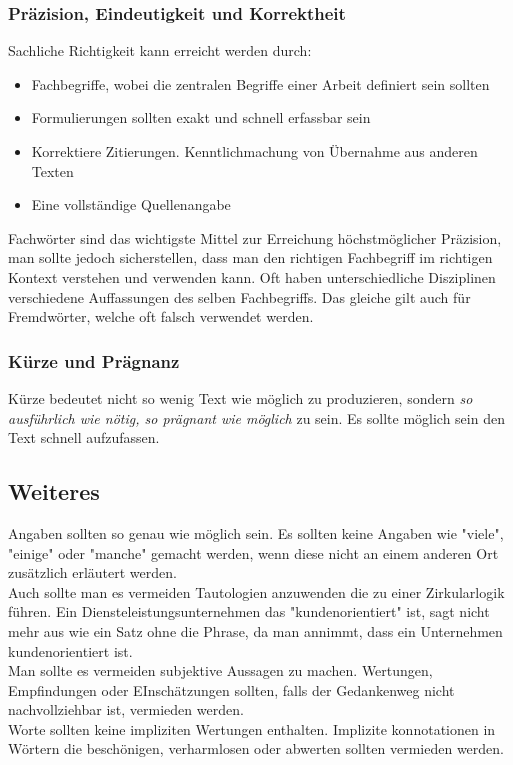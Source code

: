 \documentclass{article}
\begin{document}
	\subsubsection{Präzision, Eindeutigkeit und Korrektheit}
	Sachliche Richtigkeit kann erreicht werden durch:
	\begin{itemize}
		\item{Fachbegriffe, wobei die zentralen Begriffe einer Arbeit definiert sein sollten}
		\item{Formulierungen sollten exakt und schnell erfassbar sein}
		\item{Korrektiere Zitierungen. Kenntlichmachung von Übernahme aus anderen Texten}
		\item{Eine vollständige Quellenangabe}
	\end{itemize}
	Fachwörter sind das wichtigste Mittel zur Erreichung höchstmöglicher Präzision, man sollte jedoch sicherstellen, dass man den richtigen Fachbegriff im richtigen Kontext verstehen und verwenden kann. Oft haben unterschiedliche Disziplinen verschiedene Auffassungen des selben Fachbegriffs. Das gleiche gilt auch für Fremdwörter, welche oft falsch verwendet werden. \\
	\subsubsection{Kürze und Prägnanz}
	Kürze bedeutet nicht so wenig Text wie möglich zu produzieren, sondern \textit{so ausführlich wie nötig, so prägnant wie möglich} zu sein. Es sollte möglich sein den Text schnell aufzufassen.\\
	\subsection{Weiteres}
	Angaben sollten so genau wie möglich sein. Es sollten keine Angaben wie "viele", "einige" oder "manche" gemacht werden, wenn diese nicht an einem anderen Ort zusätzlich erläutert werden. \\
	Auch sollte man es vermeiden Tautologien anzuwenden die zu einer Zirkularlogik führen. Ein Diensteleistungsunternehmen das "kundenorientiert" ist, sagt nicht mehr aus wie ein Satz ohne die Phrase, da man annimmt, dass ein Unternehmen kundenorientiert ist. \\
	Man sollte es vermeiden subjektive Aussagen zu machen. Wertungen, Empfindungen oder EInschätzungen sollten, falls der Gedankenweg nicht nachvollziehbar ist, vermieden werden. \\
	Worte sollten keine impliziten Wertungen enthalten. Implizite konnotationen in Wörtern die beschönigen, verharmlosen oder abwerten sollten vermieden werden.
\end{document}
